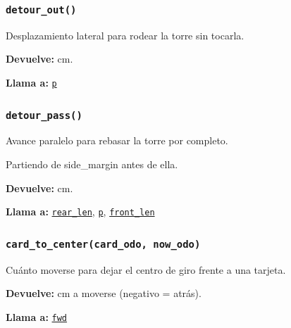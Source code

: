 \subsubsection{\texttt{detour\_\allowbreak{}out()}}\label{fn:geometry:detour-out}
\noindent Desplazamiento lateral para rodear la torre sin tocarla.

\noindent\textbf{Devuelve:} cm.\par
\noindent\textbf{Llama a:} \hyperref[fn:geometry:p]{\texttt{p}}\par

\subsubsection{\texttt{detour\_\allowbreak{}pass()}}\label{fn:geometry:detour-pass}
\noindent Avance paralelo para rebasar la torre por completo.

Partiendo de side\_margin antes de ella.

\noindent\textbf{Devuelve:} cm.\par
\noindent\textbf{Llama a:} \hyperref[fn:geometry:rear-len]{\texttt{rear\_\allowbreak{}len}}, \hyperref[fn:geometry:p]{\texttt{p}}, \hyperref[fn:geometry:front-len]{\texttt{front\_\allowbreak{}len}}\par

\subsubsection{\texttt{card\_\allowbreak{}to\_\allowbreak{}center(card\_\allowbreak{}odo, now\_\allowbreak{}odo)}}\label{fn:geometry:card-to-center}
\noindent Cuánto moverse para dejar el centro de giro frente a una tarjeta.

\par{}\par\smallskip
\noindent\textbf{Devuelve:} cm a moverse (negativo = atrás).\par
\noindent\textbf{Llama a:} \hyperref[fn:geometry:fwd]{\texttt{fwd}}\par

